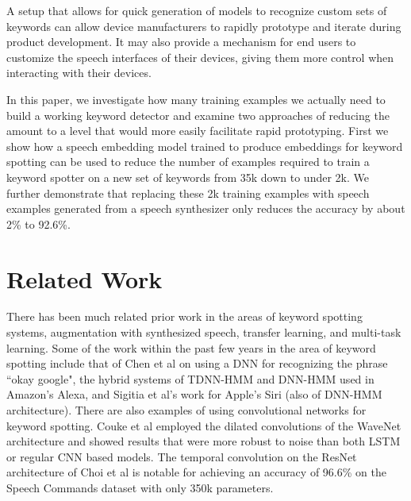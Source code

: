 \documentclass{article}
\begin{document}
A setup that allows for quick generation of models to recognize custom sets of keywords can allow device manufacturers to rapidly prototype and iterate during product development. It may also provide a mechanism for end users to customize the speech interfaces of their devices, giving them more control when interacting with their devices. 


In this paper, we investigate how many training examples we actually need to build a working keyword detector and examine two approaches of reducing the amount to a level that would more easily facilitate rapid prototyping. First we show how a speech embedding model trained to produce embeddings for keyword spotting can be used to reduce the number of examples required to train a keyword spotter on a new set of keywords from 35k down to under 2k.
We further demonstrate that replacing these 2k training examples with speech examples generated from a speech synthesizer only reduces the accuracy by about 2\% to 92.6\%.















\section{Related Work}
\label{sec:related_work}

There has been much related prior work in the areas of keyword spotting systems, augmentation with synthesized speech, transfer learning, and multi-task learning. Some of the work within the past few years in the area of keyword spotting include that of Chen et al \cite{Chen2014SmallfootprintKS} on using a DNN for recognizing the phrase ``okay google", the hybrid systems of TDNN-HMM \cite{Sun2017CompressedTD} and DNN-HMM \cite{raju2018data} used in Amazon's Alexa, and Sigitia et al's work for Apple's Siri \cite{Sigtia2018EfficientVT} (also of DNN-HMM architecture). There are also examples of using convolutional networks for keyword spotting. Couke et al \cite{Coucke_2019} employed the dilated convolutions of the WaveNet \cite{oord2016wavenet} architecture and showed results that were more robust to noise than both LSTM or regular CNN based models. The temporal convolution on the ResNet \cite{he2015deep} architecture of Choi et al \cite{choi2019temporal} is notable for achieving an accuracy of 96.6\% on the Speech Commands dataset \cite{warden2018speech} with only 350k parameters.
\end{document}
